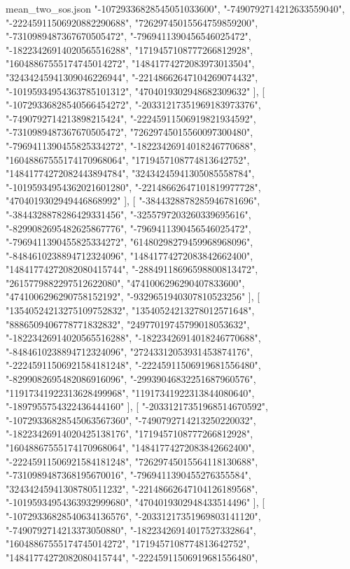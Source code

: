 \begin{filecontents*}[overwrite]{mean_two_sos.json}
    "-10729336828545051033600",
    "-7490792714212633559040",
    "-22245911506920882290688",
    "72629745015564759859200",
    "-7310989487367670505472",
    "-7969411390456546025472",
    "-18223426914020565516288",
    "1719457108777266812928",
    "16048867555174745014272",
    "14841774272083973013504",
    "32434245941309046226944",
    "-22148662647104269074432",
    "-10195934954363785101312",
    "4704019302948682309632"
   ],
   [
    "-10729336828540566454272",
    "-20331217351969183973376",
    "-7490792714213898215424",
    "-22245911506919821934592",
    "-7310989487367670505472",
    "72629745015560097300480",
    "-7969411390455825334272",
    "-18223426914018246770688",
    "16048867555174170968064",
    "1719457108774813642752",
    "14841774272082443894784",
    "32434245941305085558784",
    "-10195934954362021601280",
    "-22148662647101819977728",
    "4704019302949446868992"
   ],
   [
    "-3844328878285946781696",
    "-3844328878286429331456",
    "-3255797203260339695616",
    "-8299082695482625867776",
    "-7969411390456546025472",
    "-7969411390455825334272",
    "61480298279459968968096",
    "-8484610238894712324096",
    "14841774272083842662400",
    "14841774272082080415744",
    "-28849118696598800813472",
    "2615779882297512622080",
    "4741006296290407833600",
    "4741006296290758152192",
    "-9329651940307810523256"
   ],
   [
    "13540524213275109752832",
    "13540524213278012571648",
    "8886509406778771832832",
    "24977019745799018053632",
    "-18223426914020565516288",
    "-18223426914018246770688",
    "-8484610238894712324096",
    "27243312053931453874176",
    "-22245911506921584181248",
    "-22245911506919681556480",
    "-8299082695482086916096",
    "-29939046832251687960576",
    "11917341922313628499968",
    "11917341922313844080640",
    "-1897955754322436444160"
   ],
   [
    "-20331217351968514670592",
    "-10729336828545063567360",
    "-7490792714213250220032",
    "-18223426914020425138176",
    "1719457108777266812928",
    "16048867555174170968064",
    "14841774272083842662400",
    "-22245911506921584181248",
    "72629745015564118130688",
    "-7310989487368195670016",
    "-7969411390455276355584",
    "32434245941308780511232",
    "-22148662647104126189568",
    "-10195934954363932999680",
    "4704019302948433514496"
   ],
   [
    "-10729336828540634136576",
    "-20331217351969803141120",
    "-7490792714213373050880",
    "-18223426914017527332864",
    "16048867555174745014272",
    "1719457108774813642752",
    "14841774272082080415744",
    "-22245911506919681556480",

\end{filecontents*}
